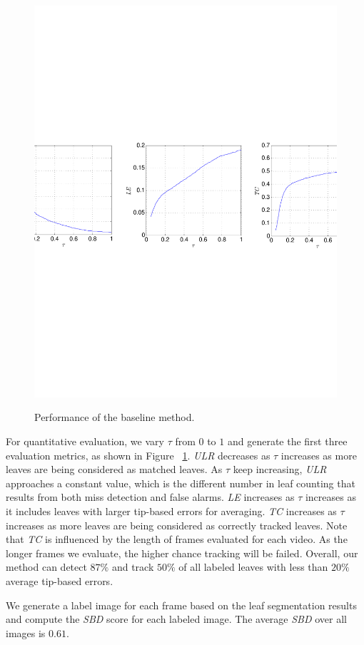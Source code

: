 \begin{figure}
\centering
\includegraphics[width=.98\textwidth]{Figures/performance.pdf}\\
\caption{Performance of the baseline method.}
\label{fig:performance}
\end{figure}

For quantitative evaluation, we vary $\tau$ from $0$ to $1$ and generate the first three evaluation metrics, as shown in Figure ~\ref{fig:performance}.
{\it{ULR}} decreases as $\tau$ increases as more leaves are being considered as matched leaves.
As $\tau$ keep increasing, {\it{ULR}} approaches a constant value, which is the different number in leaf counting that results from both miss detection and false alarms.
{\it{LE}} increases as $\tau$ increases as it includes leaves with larger tip-based errors for averaging.
{\it{TC}} increases as $\tau$ increases as more leaves are being considered as correctly tracked leaves.
Note that {\it{TC}} is influenced by the length of frames evaluated for each video.
As the longer frames we evaluate, the higher chance tracking will be failed.
Overall, our method can detect $87\%$ and track $50\%$ of all labeled leaves with less than $20\%$ average tip-based errors.

We generate a label image for each frame based on the leaf segmentation results and compute the {\it{SBD}} score for each labeled image.
The average {\it{SBD}} over all images is $0.61$.









